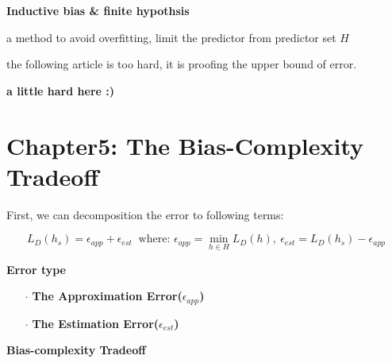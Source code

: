 \textbf{Inductive bias \& finite hypothsis}

a method to avoid overfitting, limit the predictor from predictor set $H$

the following article is too hard, it is proofing the upper bound of error.

\textbf{\color{red} a little hard here :)}

\newpage


\section*{Chapter5: The Bias-Complexity Tradeoff}

First, we can decomposition the error to following terms:

$$L_D(h_s) = \epsilon_{app} + \epsilon_{est} ~\text{ where: } \epsilon_{app} = \min_{h \in H}L_D(h),~\epsilon_{est} = L_D(h_s) - \epsilon_{app}$$


\textbf{Error type}
\begin{enumerate}
	\item[$\cdot$] \textbf{The Approximation Error($\epsilon_{app}$)}
	\item[$\cdot$] \textbf{The Estimation Error($\epsilon_{est}$)}
\end{enumerate}

\textbf{Bias-complexity Tradeoff}













